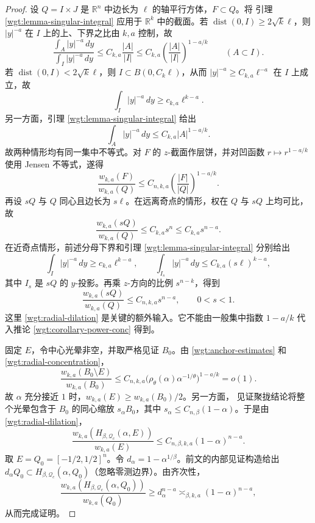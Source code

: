 \begin{proof}
设 \(Q=I\times J\) 是 \(\mathbb R^n\) 中边长为 \(\ell\) 的轴平行方体，\(F\subset Q\)。将
引理 \ref{wgt:lemma-singular-integral} 应用于 \(\mathbb R^k\) 中的截面。若
\(\operatorname{dist}(0,I)\geq2\sqrt k\ell\)，则 \(|y|^{-a}\) 在 \(I\) 上的上、下界之比由
\(k,a\) 控制，故
\[
 \frac{\int_A|y|^{-a}\,dy}{\int_I|y|^{-a}\,dy}
 \leq C_{k,a}\frac{|A|}{|I|}
 \leq C_{k,a}\left(\frac{|A|}{|I|}\right)^{1-a/k}
 \qquad(A\subset I).
\]
若 \(\operatorname{dist}(0,I)<2\sqrt k\ell\)，则 \(I\subset B(0,C_k\ell)\)，从而
\(|y|^{-a}\geq C_{k,a}\ell^{-a}\) 在 \(I\) 上成立，故
\[
 \int_I|y|^{-a}\,dy\geq c_{k,a}\ell^{k-a}.
\]
另一方面，引理 \ref{wgt:lemma-singular-integral} 给出
\[
 \int_A|y|^{-a}\,dy\leq C_{k,a}|A|^{1-a/k}.
\]
故两种情形均有同一集中不等式。对 \(F\) 的 \(z\)-截面作层饼，并对凹函数
\(r\mapsto r^{1-a/k}\) 使用 Jensen 不等式，遂得
\begin{equation}
 \frac{w_{k,a}(F)}{w_{k,a}(Q)}
 \leq C_{n,k,a}\left(\frac{|F|}{|Q|}\right)^{1-a/k}.
\label{wgt:radial-concentration}
\end{equation}
再设 \(sQ\) 与 \(Q\) 同心且边长为 \(s\ell\)。在远离奇点的情形，权在 \(Q\) 与
\(sQ\) 上均可比，故
\[
 \frac{w_{k,a}(sQ)}{w_{k,a}(Q)}\leq C_{k,a}s^n\leq C_{k,a}s^{n-a}.
\]
在近奇点情形，前述分母下界和引理 \ref{wgt:lemma-singular-integral} 分别给出
\[
 \int_I|y|^{-a}\,dy\geq c_{k,a}\ell^{k-a},\qquad
 \int_{I_s}|y|^{-a}\,dy\leq C_{k,a}(s\ell)^{k-a},
\]
其中 \(I_s\) 是 \(sQ\) 的 \(y\)-投影。再乘 \(z\)-方向的比例 \(s^{n-k}\)，得到
\begin{equation}
 \frac{w_{k,a}(sQ)}{w_{k,a}(Q)}\leq C_{n,k,a}s^{n-a},\qquad0<s<1.
\label{wgt:radial-dilation}
\end{equation}
这里 \eqref{wgt:radial-dilation} 是关键的额外输入。它不能由一般集中指数
\(1-a/k\) 代入推论 \ref{wgt:corollary-power-conc} 得到。

固定 \(E\)，令中心光晕非空，并取严格见证 \(B_0\)。由 \eqref{wgt:anchor-estimates} 和
\eqref{wgt:radial-concentration}，
\[
 \frac{w_{k,a}(B_0\setminus E)}{w_{k,a}(B_0)}
 \leq C_{n,k,a}\bigl(\rho_\theta(\alpha)\alpha^{-1/\theta}\bigr)^{1-a/k}=o(1).
\]
故 \(\alpha\) 充分接近 \(1\) 时，\(w_{k,a}(E)\geq w_{k,a}(B_0)/2\)。另一方面，
见证聚拢结论将整个光晕包含于 \(B_0\) 的同心缩放 \(s_\alpha B_0\)，其中
\(s_\alpha\leq C_{n,\beta}(1-\alpha)\)。于是由 \eqref{wgt:radial-dilation}，
\[
 \frac{w_{k,a}(H_{\beta,\mathcal Q_c}(\alpha,E))}{w_{k,a}(E)}
 \leq C_{n,\beta,k,a}(1-\alpha)^{n-a}.
\]
取 \(E=Q_0=[-1/2,1/2]^n\)。令 \(d_\alpha=1-\alpha^{1/\beta}\)。前文的内部见证构造给出
\(d_\alpha Q_0\subset H_{\beta,\mathcal Q_c}(\alpha,Q_0)\)（忽略零测边界）。由齐次性，
\[
 \frac{w_{k,a}(H_{\beta,\mathcal Q_c}(\alpha,Q_0))}{w_{k,a}(Q_0)}
 \geq d_\alpha^{n-a}\asymp_{\beta,k,a}(1-\alpha)^{n-a},
\]
从而完成证明。
\end{proof}

